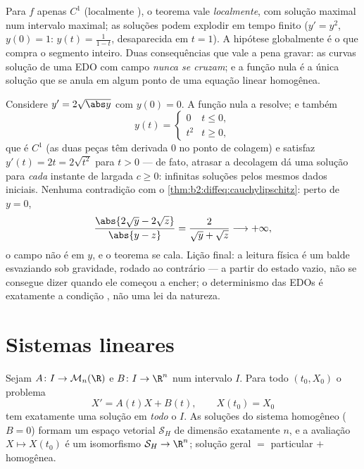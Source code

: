 \begin{remark}
Para $f$ apenas $C^1$ (localmente ), o teorema vale
\emph{localmente}, com solução maximal num intervalo  maximal;
as soluções podem explodir em tempo finito ($y' = y^2$, $y(0) = 1$: $y(t)
= \frac{1}{1-t}$, desaparecida em $t = 1$). A hipótese globalmente 
é o que compra o segmento inteiro. Duas consequências que vale a pena gravar:
as curvas solução de uma EDO com campo  \emph{nunca se cruzam};
e a função nula é a única solução que se anula em algum ponto de uma
equação linear homogênea.
\end{remark}

\begin{example}\label{ex:b2:diffeq:leaky}
Considere $y' = 2\sqrt{\abs y}$ com $y(0) = 0$. A função nula
a resolve; e também
\[
y(t) = \begin{cases} 0 & t \leq 0,\\ t^2 & t \geq 0,
\end{cases}
\]
que é $C^1$ (as duas peças têm derivada $0$ no ponto de
colagem) e satisfaz $y'(t) = 2t = 2\sqrt{t^2}$ para $t > 0$ ---
de fato, atrasar a decolagem dá uma solução para \emph{cada}
instante de largada $c \geq 0$: infinitas soluções pelos
mesmos dados iniciais. Nenhuma contradição com o
\cref{thm:b2:diffeq:cauchylipschitz}: perto de $y = 0$,
\[
\frac{\abs{2\sqrt y - 2\sqrt z}}{\abs{y - z}}
= \frac{2}{\sqrt y + \sqrt z} \longrightarrow +\infty ,
\]
o campo não é  em $y$, e o teorema se cala.
Lição final: a leitura física é um balde esvaziando
sob gravidade, rodado ao contrário --- a partir do estado vazio, não
se consegue dizer quando ele começou a encher; o determinismo das EDOs é
exatamente a condição , não uma lei da natureza.
\end{example}

\section{Sistemas lineares}

\begin{theorem}\label{thm:b2:diffeq:linear}
Sejam $A \colon I \to \mathcal{M}_n(\R)$ e $B \colon I \to \R^n$
 num intervalo $I$. Para todo $(t_0, X_0)$ o problema
\[
X' = A(t)X + B(t), \qquad X(t_0) = X_0
\]
tem exatamente uma solução em \emph{todo} o $I$. As soluções do
sistema homogêneo ($B = 0$) formam um espaço vetorial $\mathcal{S}_H$ de
dimensão exatamente $n$, e a avaliação $X \mapsto X(t_0)$ é um
isomorfismo $\mathcal{S}_H \to \R^n$; solução geral $=$
particular $+$ homogênea.
\end{theorem}

